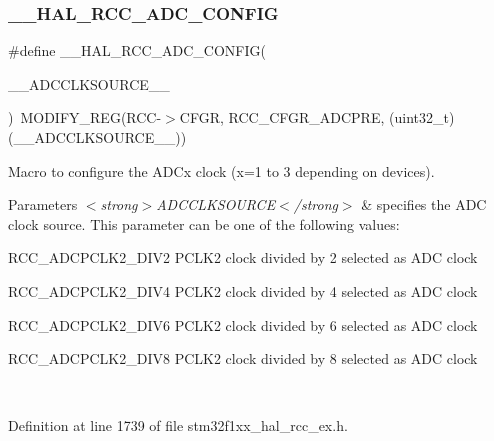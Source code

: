 \subsubsection{\texorpdfstring{\+\_\+\+\_\+\+H\+A\+L\+\_\+\+R\+C\+C\+\_\+\+A\+D\+C\+\_\+\+C\+O\+N\+F\+IG}{\_\_HAL\_RCC\_ADC\_CONFIG}}
{\footnotesize\ttfamily \#define \+\_\+\+\_\+\+H\+A\+L\+\_\+\+R\+C\+C\+\_\+\+A\+D\+C\+\_\+\+C\+O\+N\+F\+IG(\begin{DoxyParamCaption}\item[{}]{\+\_\+\+\_\+\+A\+D\+C\+C\+L\+K\+S\+O\+U\+R\+C\+E\+\_\+\+\_\+ }\end{DoxyParamCaption})~M\+O\+D\+I\+F\+Y\+\_\+\+R\+EG(R\+CC-\/$>$C\+F\+GR, R\+C\+C\+\_\+\+C\+F\+G\+R\+\_\+\+A\+D\+C\+P\+RE, (uint32\+\_\+t)(\+\_\+\+\_\+\+A\+D\+C\+C\+L\+K\+S\+O\+U\+R\+C\+E\+\_\+\+\_\+))}



Macro to configure the A\+D\+Cx clock (x=1 to 3 depending on devices). 


\begin{DoxyParams}{Parameters}
{\em $<$strong$>$\+A\+D\+C\+C\+L\+K\+S\+O\+U\+R\+C\+E$<$/strong$>$} & specifies the A\+DC clock source. This parameter can be one of the following values\+: \begin{DoxyItemize}
\item R\+C\+C\+\_\+\+A\+D\+C\+P\+C\+L\+K2\+\_\+\+D\+I\+V2 P\+C\+L\+K2 clock divided by 2 selected as A\+DC clock \item R\+C\+C\+\_\+\+A\+D\+C\+P\+C\+L\+K2\+\_\+\+D\+I\+V4 P\+C\+L\+K2 clock divided by 4 selected as A\+DC clock \item R\+C\+C\+\_\+\+A\+D\+C\+P\+C\+L\+K2\+\_\+\+D\+I\+V6 P\+C\+L\+K2 clock divided by 6 selected as A\+DC clock \item R\+C\+C\+\_\+\+A\+D\+C\+P\+C\+L\+K2\+\_\+\+D\+I\+V8 P\+C\+L\+K2 clock divided by 8 selected as A\+DC clock \end{DoxyItemize}
\\
\hline
\end{DoxyParams}


Definition at line 1739 of file stm32f1xx\+\_\+hal\+\_\+rcc\+\_\+ex.\+h.

\mbox{\label{group___r_c_c_ex___peripheral___configuration_ga2ee9f1838a8450f949b548a06ed3bc58}} 
